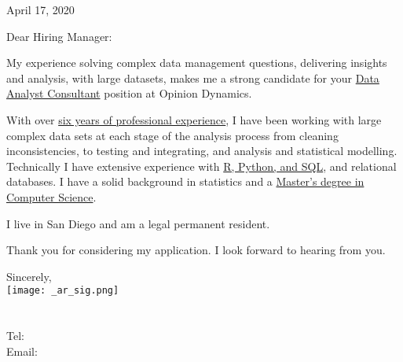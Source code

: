 \documentclass[letterpaper]{article}
\newcommand{\impt}[1]{\uline{#1}}
\newcommand{\CVjobTitle}{Data Analyst Consultant}
\newcommand{\CVcompany}{Opinion Dynamics}
\begin{document}
\large

\null\hfill April 17, 2020
\vspace{1em}

Dear Hiring Manager:

\iffalse

insightful research
inter-disciplinary team
inform program planning and design
performance assessment, and optimization
solve complex data management questions 
enjoys data mining and data munging
problem solver,
multidisciplinary team of data scientists, statisticians, data analysts, and programmers.


data management, ideally developing and maintaining databases, 
data ingestion, cleaning, summarizing, aggregation and manipulation
Strong programming skills in one or more programming languages (R, Python, Java, SQL, go, Scala, etc.)

Experience importing, cleaning and manipulating large datasets (500,000+
records) using one or more statistical packages (R, Python, STATA) and
identifying, summarizing and effectively correcting data inconsistencies, as
well as clearly documenting and communicating data exploration and cleaning
decisions while assessing their effect on resulting data structures and
possible analyses

Experience conducting econometric modeling or statistical regression analysis

Demonstrated track-record of thinking critically about your work and clearly
communicating with other project staff and managers about your work
Demonstrated interest in the energy field, energy policy, or building science
Ability to juggle and prioritize multiple tasks and deadlines simultaneously
and flexibly
Two or more years’ work experience in data analysis, ideally evaluating
energy efficiency programs and/or performing other forms of longitudinal data
analysis, OR higher educational attainment with relevant coursework
\fi

My experience solving complex data management questions,
delivering insights and analysis,
with large datasets,
makes me a strong candidate for your \impt{\CVjobTitle} position at \CVcompany.

With over \impt{six years of professional experience}, I have been working with
large complex data sets at each stage of the analysis process from cleaning
inconsistencies, to testing and integrating, and analysis and statistical
modelling.
Technically I have extensive experience with \impt{R, Python, and SQL}, and relational databases.
I have a solid background in statistics and a \impt{Master's degree in Computer
Science}.

I live in San Diego and am a legal permanent resident.  

Thank you for considering my application.
I look forward to hearing from you.  


Sincerely,\\
    \hspace{1em} 
    \texttt{[image: \_ar\_sig.png]} \\
    \CVname \\
    \small
    \CVaddresswrap \\
    Tel: \CVphone \\
    Email: \CVemail
\end{document}
